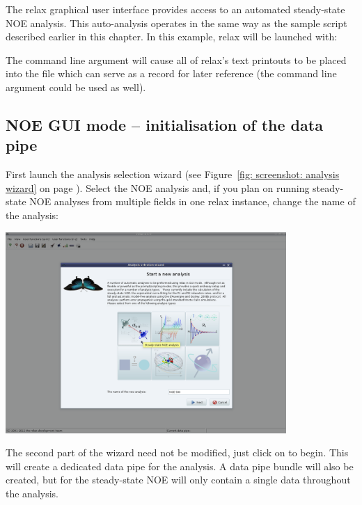 The relax graphical user interface provides access to an automated steady-state NOE analysis.  This auto-analysis operates in the same way as the sample script described earlier in this chapter.  In this example, relax will be launched with:


The  command line argument will cause all of relax's text printouts to be placed into the  file which can serve as a record for later reference (the  command line argument could be used as well).



\subsection{NOE GUI mode -- initialisation of the data pipe}

First launch the analysis selection wizard (see Figure~\ref{fig: screenshot: analysis wizard} on page \pageref{fig: screenshot: analysis wizard}).  Select the NOE analysis and, if you plan on running steady-state NOE analyses from multiple fields in one relax instance, change the name of the analysis:

\begin{minipage}[h]{\linewidth}
\centerline{\includegraphics[width=0.8\textwidth, bb=14 14 1415 1019]{graphics/screenshots/noe_analysis/analysis_wizard1}}
\end{minipage}

The second part of the wizard need not be modified, just click on  to begin.  This will create a dedicated data pipe for the analysis.  A data pipe bundle will also be created, but for the steady-state NOE will only contain a single data throughout the analysis.


